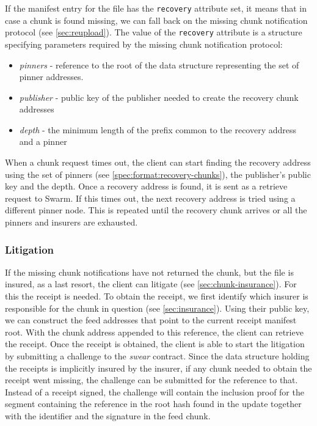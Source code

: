 If the manifest entry for the file has the \texttt{recovery} attribute set, it means that in case a chunk is found missing, we can fall back on the missing chunk notification protocol (see \ref{sec:reupload}). The value of the \texttt{recovery} attribute is a structure specifying parameters required by  the missing chunk notification protocol:

\begin{itemize}
\item \emph{pinners} - reference to the root of the data structure representing the set of pinner addresses. 
\item \emph{publisher} - public key of the publisher needed to create the recovery chunk addresses
\item \emph{depth} - the minimum length of the prefix common to the recovery address and a pinner  
\end{itemize}

When a chunk request times out, the client can start finding  the recovery address using the set of pinners (see \ref{spec:format:recovery-chunks}), the publisher's public key and the depth. Once a recovery address is found, it is sent as a retrieve request to Swarm. If this times out, the next recovery address is tried using a different pinner node. This is repeated until the recovery chunk arrives or all the pinners and insurers are exhausted.

\subsubsection{Litigation}

If the missing chunk notifications have not returned the chunk, but the file is insured, as a last resort, the client can litigate (see \ref{sec:chunk-insurance}). For this the receipt is needed. To obtain the receipt, we first identify which insurer is responsible for the chunk in question (see \ref{sec:insurance}). Using their public key, we can construct the feed addresses that point to the current receipt manifest root. With the chunk address appended to this reference, the client can retrieve the receipt. Once the receipt is obtained, the client is able to start the litigation by submitting a challenge to the \emph{swear} contract. Since the data structure holding the receipts  is implicitly insured by the insurer, if any chunk needed to obtain the receipt went missing, the challenge can be submitted for the reference to that. Instead of a receipt signed, the challenge will contain the inclusion proof for the segment containing the reference in the root hash found  in the update together with the identifier and the signature in the feed chunk. 

